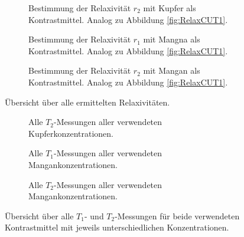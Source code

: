 \begin{figure}[H]
    \begin{subfigure}[b]{0.5\textwidth}
        \centering
        \resizebox{1\textwidth}{!}{}
        \caption{Bestimmung der Relaxivität $r_2$ mit Kupfer als Kontrastmittel. Analog zu Abbildung \ref{fig:RelaxCUT1}.}
        \label{fig:RelaxCUT2}
    \end{subfigure}
    \begin{subfigure}[b]{0.5\textwidth}
        \centering
        \resizebox{1\textwidth}{!}{}
        \caption{Bestimmung der Relaxivität $r_1$ mit Mangna als Kontrastmittel. Analog zu Abbildung \ref{fig:RelaxCUT1}.}
        \label{fig:RelaxMNT1}
    \end{subfigure}
    \begin{subfigure}[b]{1\textwidth}
        \centering
        \resizebox{0.5\textwidth}{!}{}
        \caption{Bestimmung der Relaxivität $r_2$ mit Mangan als Kontrastmittel. Analog zu Abbildung \ref{fig:RelaxCUT1}.}
        \label{fig:RelaxMNT2}
    \end{subfigure}
    \caption{Übersicht über alle ermittelten Relaxivitäten.}
    \label{fig:RelaxAlle}
\end{figure}




\begin{figure}[H]
    \begin{subfigure}[b]{0.5\textwidth}
        \centering
        \resizebox{1\textwidth}{!}{}
        \caption{Alle $T_2$-Messungen aller verwendeten Kupferkonzentrationen.}
        \label{fig:T2CU}
    \end{subfigure}
    \begin{subfigure}[b]{0.5\textwidth}
        \centering
        \resizebox{1\textwidth}{!}{}
        \caption{Alle $T_1$-Messungen aller verwendeten Mangankonzentrationen.}
        \label{fig:T1Mn}
    \end{subfigure}
    \begin{subfigure}[b]{1\textwidth}
        \centering
        \resizebox{0.5\textwidth}{!}{}
        \caption{Alle $T_2$-Messungen aller verwendeten Mangankonzentrationen.}
        \label{fig:T2M}
    \end{subfigure}
    \caption{Übersicht über alle $T_1$- und $T_2$-Messungen für beide verwendeten Kontrastmittel mit jeweils unterschiedlichen Konzentrationen.}
    \label{fig:RelaxZeitAlle}
\end{figure}
